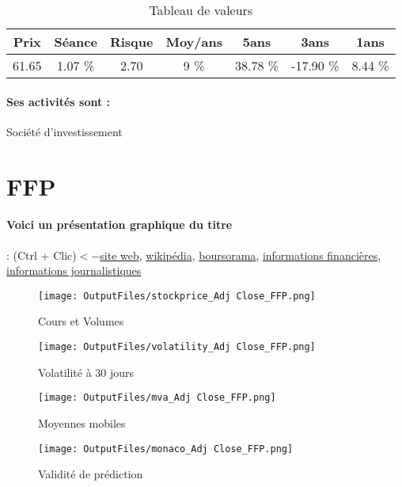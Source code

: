 \documentclass[11pt,a4paper]{report}%
\begin{document}
\begin{table}[H]
  \centering
    \begin{tabular}{|c|c|c|c|c|c|c|}
    \hline
    Prix & Séance & Risque  & Moy/ans & 5ans & 3ans & 1ans \\
    \hline
    61.65 &    1.07 \%    & 2.70 & 9 \% & 38.78 \% & -17.90 \% & 8.44 \% \\
    \hline
    \end{tabular}%
        \label{tab:table_EURAZEO}%
      \caption{Tableau de valeurs}
\end{table}%

\paragraph{Ses activités sont : } Société d’investissement 
    
    \newpage

\section{FFP}

\paragraph{Voici un présentation graphique du titre} : (Ctrl + Clic)$<-$\href{http://www.groupe-ffp.fr/fr}{site web}, \href{https://fr.wikipedia.org/wiki/Soci%C3%A9t%C3%A9_fonci%C3%A8re_financi%C3%A8re_et_de_participation}{wikipédia}, \href{https://www.boursorama.com/cours/1rPFFP}{boursorama}, \href{https://www.qwant.com/?q=site:https:%2f%2fwww.easybourse.com%2faction-societe%2fFFP&t=web&client=ext-firefox-hp}{informations financières}, \href{https://bourse.lerevenu.com/cours-de-bourse/fiche-valeur-synthese/FFP/FFP-FR}{informations journalistiques}
\begin{figure}[!htb]
   \begin{minipage}{0.5\textwidth}
     \centering
     \texttt{[image: OutputFiles/stockprice\_Adj Close\_FFP.png]}
     \caption{Cours et Volumes}\label{Fig:price_FFP}
   \end{minipage}\hfill
   \begin{minipage}{0.5\textwidth}
     \centering
     \texttt{[image: OutputFiles/volatility\_Adj Close\_FFP.png]}
     \caption{Volatilité à 30 jours}\label{Fig:volat_FFP}
   \end{minipage}
\end{figure}
\begin{figure}[!htb]
   \begin{minipage}{0.5\textwidth}
     \centering
     \texttt{[image: OutputFiles/mva\_Adj Close\_FFP.png]}
     \caption{Moyennes mobiles}\label{Fig:mva_FFP}
   \end{minipage}\hfill
   \begin{minipage}{0.5\textwidth}
     \centering
     \texttt{[image: OutputFiles/monaco\_Adj Close\_FFP.png]}
     \caption{Validité de prédiction}\label{Fig:prediction_FFP}
   \end{minipage}
\end{figure}
\end{document}
